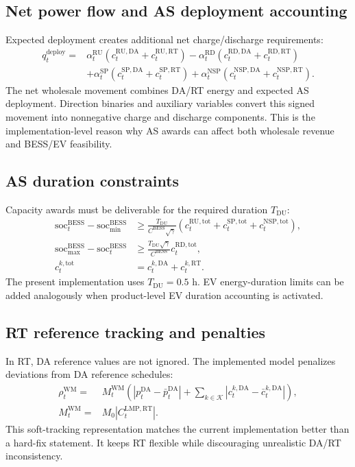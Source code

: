 \documentclass[final,5p,times]{elsarticle}
\newcommand{\BESS}{\mathrm{BESS}}
\newcommand{\DA}{\mathrm{DA}}
\newcommand{\RT}{\mathrm{RT}}
\newcommand{\soc}{\mathrm{soc}}
\newcommand{\RU}{\mathrm{RU}}
\newcommand{\RD}{\mathrm{RD}}
\newcommand{\SP}{\mathrm{SP}}
\newcommand{\NSP}{\mathrm{NSP}}
\newcommand{\WM}{\mathrm{WM}}
\newcommand{\tot}{\mathrm{tot}}
\newcommand{\deploy}{\mathrm{deploy}}
\newcommand{\calK}{\mathcal{K}}
\begin{document}
\subsection{Net power flow and AS deployment accounting}
Expected deployment creates additional net charge/discharge requirements:
\begin{align}
q_t^{\deploy}=&\alpha_t^{\RU}(c_t^{\RU,\DA}+c_t^{\RU,\RT})-
\alpha_t^{\RD}(c_t^{\RD,\DA}+c_t^{\RD,\RT})\nonumber\\
&+\alpha_t^{\SP}(c_t^{\SP,\DA}+c_t^{\SP,\RT})+
\alpha_t^{\NSP}(c_t^{\NSP,\DA}+c_t^{\NSP,\RT}).\label{eq:app_deploy}
\end{align}
The net wholesale movement combines DA/RT energy and expected AS deployment. Direction binaries and auxiliary variables convert this signed movement into nonnegative charge and discharge components. This is the implementation-level reason why AS awards can affect both wholesale revenue and BESS/EV feasibility.

\subsection{AS duration constraints}
Capacity awards must be deliverable for the required duration $T_{\mathrm{DU}}$:
\begin{align}
\soc_t^{\BESS}-\soc_{\min}^{\BESS}
&\ge \frac{T_{\mathrm{DU}}}{C^{\BESS}\sqrt{\gamma}}
\left(c_t^{\RU,\tot}+c_t^{\SP,\tot}+c_t^{\NSP,\tot}\right),\label{eq:app_duration_up}\\
\soc_{\max}^{\BESS}-\soc_t^{\BESS}
&\ge \frac{T_{\mathrm{DU}}\sqrt{\gamma}}{C^{\BESS}}c_t^{\RD,\tot},\label{eq:app_duration_down}\\
c_t^{k,\tot}&=c_t^{k,\DA}+c_t^{k,\RT}.\label{eq:app_capacity_total}
\end{align}
The present implementation uses $T_{\mathrm{DU}}=0.5$ h. EV energy-duration limits can be added analogously when product-level EV duration accounting is activated.

\subsection{RT reference tracking and penalties}
In RT, DA reference values are not ignored. The implemented model penalizes deviations from DA reference schedules:
\begin{align}
\rho_t^{\WM}=&M_t^{\WM}\left(|p_t^{\DA}-\bar p_t^{\DA}|+
\sum_{k\in\calK}|c_t^{k,\DA}-\bar c_t^{k,\DA}|\right),\label{eq:app_rt_penalty}\\
M_t^{\WM}=&M_0|C_t^{\mathrm{LMP},\RT}|.\label{eq:app_rt_weight}
\end{align}
This soft-tracking representation matches the current implementation better than a hard-fix statement. It keeps RT flexible while discouraging unrealistic DA/RT inconsistency.
\end{document}
